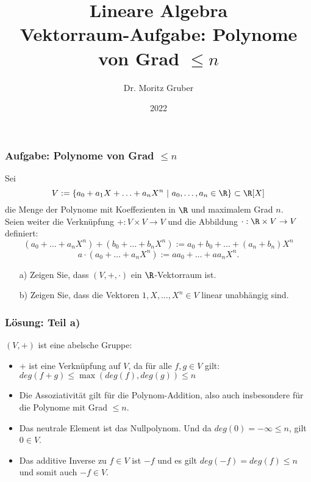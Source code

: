 

\title{Lineare Algebra\\[3mm] 
	\large Vektorraum-Aufgabe: Polynome von Grad $\le n$
}
\author{Dr. Moritz Gruber} 
\date{2022}



%
\begin{frame}[plain] 
 \titlepage
\end{frame}
%
\begin{frame}\frametitle{Aufgabe: Polynome von Grad $\le n$}
Sei
$$
	V := \{a_0 +a_1X+\ldots +a_nX^n~|~ a_0,\ldots, a_n\in \R \} \subset \R[X]
$$
die Menge der Polynome mit Koeffezienten in $\R$ und maximalem Grad $n$.\\

Seien weiter die Verkn\"upfung $+:V \times V \to V$ und die Abbildung $\cdot: \R\times V \to V$ definiert:
$$
	(a_0 +\ldots +a_nX^n) + (b_0 +\ldots +b_nX^n) := a_0 +b_0+\ldots +(a_n+b_n)X^n
$$
$$
	a\cdot(a_0 +\ldots +a_nX^n) := aa_0 +\ldots +aa_nX^n.
$$

\begin{itemize}
	\item[a)] Zeigen Sie, dass $(V,+,\cdot)$  ein $\R$-Vektorraum ist.
	\item[b)] Zeigen Sie, dass die Vektoren $1, X, \ldots, X^n \in V$ linear unabh\"angig sind.
\end{itemize}
%
\end{frame}
%
%
\begin{frame}\frametitle{Lösung: Teil a)}
%
$(V,+)$ ist eine abelsche Gruppe: \pause
\vfill
\begin{itemize}
\item $+$ ist eine Verknüpfung auf $V$, da für alle $f,g \in V$ gilt: $deg(f+g)\le \max(deg(f),deg(g))\le n$ \pause
\item Die Assoziativität gilt für die Polynom-Addition, also auch insbesondere für die Polynome mit Grad $\le n$.\pause
\item Das neutrale Element ist das Nullpolynom. Und da $deg(0)=-\infty \le n$, gilt $0 \in V$.\pause
\item Das additive Inverse zu $f \in V$ ist $-f$ und es gilt $deg(-f)=deg(f) \le n$ und somit auch $-f \in V$.
\end{itemize}

\end{frame}
